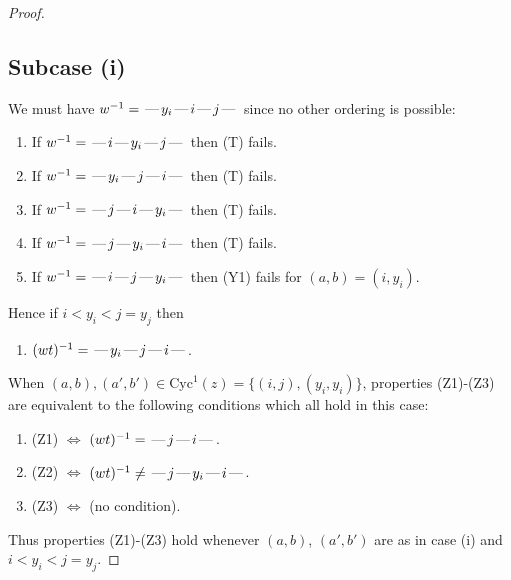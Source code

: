 \documentclass[10pt]{article}
\theoremstyle{definition}
\theoremstyle{definition}
\def\dash{\text{\hspace{0.5mm}---\hspace{0.5mm}}}
\def\Cyc{\mathrm{Cyc}}
\begin{document}
\begin{proof}
\subsection{Subcase (i)}
We must have $w^{-1} = \dash y_i\dash i\dash j\dash $
since no other ordering is possible:
\begin{enumerate}
\item If $w^{-1} = \dash i\dash y_i\dash j\dash $ then (T) fails.
\item If $w^{-1} = \dash y_i\dash j\dash i\dash $ then (T) fails.
\item If $w^{-1} = \dash j\dash i\dash y_i\dash $ then (T) fails.
\item If $w^{-1} = \dash j\dash y_i\dash i\dash $ then (T) fails.
\item If $w^{-1} = \dash i\dash j\dash y_i\dash $ then (Y1) fails for $(a,b)=(i,y_i)$.
\end{enumerate}
Hence if $i < y_i < j = y_j$ then \begin{enumerate}\item[] $(wt)^{-1} = \dash y_i\dash j\dash i\dash $. \end{enumerate}
When $(a,b),(a',b')\in\Cyc^1(z)= \{(i,j),(y_i,y_i)\}$,
properties (Z1)-(Z3) are equivalent to the following conditions which all hold in this case:
\begin{enumerate}
\item[](Z1) $\Leftrightarrow$ $(wt)^{-1} = \dash j \dash i \dash$.
\item[](Z2) $\Leftrightarrow$ $(wt)^{-1} \neq \dash j \dash y_i \dash i \dash$.
\item[](Z3) $\Leftrightarrow$ (no condition).
\end{enumerate}
Thus properties (Z1)-(Z3) hold whenever $(a,b)$, $(a',b')$ are as in case (i) and $i < y_i < j = y_j$.

\end{proof}
\end{document}
